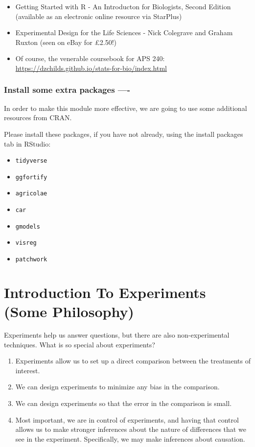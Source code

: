 \documentclass[
]{book}
\providecommand{\tightlist}{%
  \setlength{\itemsep}{0pt}\setlength{\parskip}{0pt}}
\begin{document}
\begin{itemize}
\tightlist
\item
  Getting Started with R - An Introducton for Biologists, Second Edition (available as an electronic online resource via StarPlus)
\item
  Experimental Design for the Life Sciences - Nick Colegrave and Graham Ruxton (seen on eBay for £2.50!)
\item
  Of course, the venerable coursebook for APS 240: \url{https://dzchilds.github.io/stats-for-bio/index.html}
\end{itemize}

\hypertarget{install-some-extra-packages--}{%
\subsection{Install some extra packages ----}\label{install-some-extra-packages--}}

In order to make this module more effective, we are going to use some additional resources from CRAN.

Please install these packages, if you have not already, using the install packages tab in RStudio:

\begin{itemize}
\tightlist
\item
  \texttt{tidyverse}
\item
  \texttt{ggfortify}
\item
  \texttt{agricolae}
\item
  \texttt{car}
\item
  \texttt{gmodels}
\item
  \texttt{visreg}
\item
  \texttt{patchwork}
\end{itemize}

\hypertarget{intro}{%
\chapter{Introduction To Experiments (Some Philosophy)}\label{intro}}

Experiments help us answer questions, but there are also non-experimental techniques. What is so special about experiments?

\begin{enumerate}
\def\labelenumi{\arabic{enumi}.}
\tightlist
\item
  Experiments allow us to set up a direct comparison between the treatments of interest.
\item
  We can design experiments to minimize any bias in the comparison.
\item
  We can design experiments so that the error in the comparison is small.
\item
  Most important, we are in control of experiments, and having that control
  allows us to make stronger inferences about the nature of differences
  that we see in the experiment. Specifically, we may make inferences
  about causation.
\end{enumerate}
\end{document}
